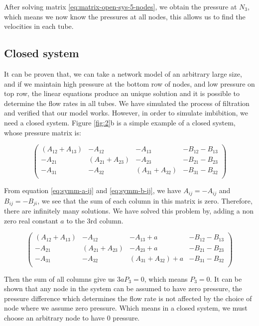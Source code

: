 \documentclass[
	12pt
] {article}
\begin{document}
	After solving matrix \ref{eq:matrix-open-sys-5-nodes}, we obtain the pressure at $N_3$, which means we now know the pressures at all nodes, this allows us to find the velocities in each tube.
	
\subsection{Closed system}	
	It can be proven that, we can take a network model of an arbitrary large size, and if we maintain high pressure at the bottom row of nodes, and low pressure on top row, the linear equations produce an unique solution and it is possible to determine the flow rates in all tubes. We have simulated the process of filtration and verified that our model works. However, in order to simulate imbibition, we need a closed system. Figure \ref{fig:2}b is a simple example of a closed system, whose pressure matrix is:
	
	\begin{equation}
		\begin{pmatrix}
			(A_{12} + A_{13}) & -A_{12} & -A_{13} & -B_{12} - B_{13} \\
			-A_{21} & (A_{21} + A_{23}) & -A_{23} & -B_{21} - B_{23} \\
			-A_{31} & -A_{32} & (A_{31} + A_{32}) & -B_{31} - B_{32} \\
		\end{pmatrix}
	\end{equation}
	
	From equation \ref{eq:symm-a-ij} and \ref{eq:symm-b-ij}, we have $A_{ij} = -A_{ij}$ and $B_{ij} = - B_{ji}$, we see that the sum of each column in this matrix is zero. Therefore, there are infinitely many solutions. We have solved this problem by, adding a non zero real constant $a$ to the 3rd column.
	
	\begin{equation}
		\begin{pmatrix}
			(A_{12} + A_{13}) & -A_{12} & -A_{13} + a & -B_{12} - B_{13} \\
			-A_{21} & (A_{21} + A_{23}) & -A_{23} + a & -B_{21} - B_{23} \\
			-A_{31} & -A_{32} & (A_{31} + A_{32}) + a & -B_{31} - B_{32} \\
		\end{pmatrix}
	\end{equation}
	
	Then the sum of all columns give us $3aP_3 = 0$, which means $P_3 = 0$. It can be shown that any node in the system can be assumed to have zero pressure, the pressure difference which determines the flow rate is not affected by the choice of node where we assume zero pressure. Which means in a closed system, we must choose an arbitrary node to have $0$ pressure.
\end{document}
